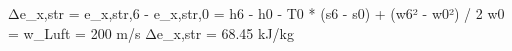 Δe_x,str = e_x,str,6 - e_x,str,0 = h6 - h0 - T0 * (s6 - s0) + (w6² - w0²) / 2  
w0 = w_Luft = 200 m/s  
Δe_x,str = 68.45 kJ/kg